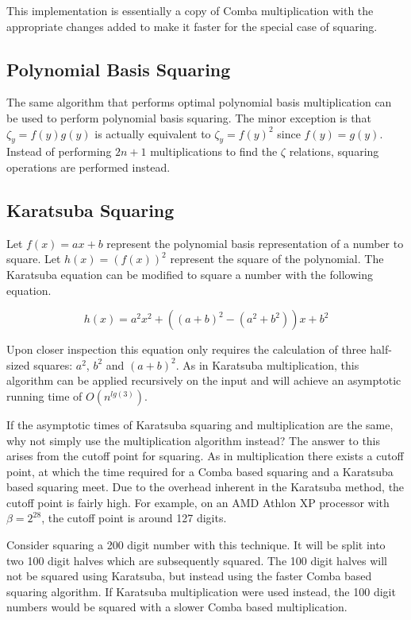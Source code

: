 \documentclass[b5paper]{book}
\begin{document}
This implementation is essentially a copy of Comba multiplication with the appropriate changes added to make it faster for 
the special case of squaring.  

\subsection{Polynomial Basis Squaring}
The same algorithm that performs optimal polynomial basis multiplication can be used to perform polynomial basis squaring.  The minor exception
is that $\zeta_y = f(y)g(y)$ is actually equivalent to $\zeta_y = f(y)^2$ since $f(y) = g(y)$.  Instead of performing $2n + 1$
multiplications to find the $\zeta$ relations, squaring operations are performed instead.  

\subsection{Karatsuba Squaring}
Let $f(x) = ax + b$ represent the polynomial basis representation of a number to square.  
Let $h(x) = \left ( f(x) \right )^2$ represent the square of the polynomial.  The Karatsuba equation can be modified to square a 
number with the following equation.

\begin{equation}
h(x) = a^2x^2 + \left ((a + b)^2 - (a^2 + b^2) \right )x + b^2
\end{equation}

Upon closer inspection this equation only requires the calculation of three half-sized squares: $a^2$, $b^2$ and $(a + b)^2$.  As in 
Karatsuba multiplication, this algorithm can be applied recursively on the input and will achieve an asymptotic running time of 
$O \left ( n^{lg(3)} \right )$.

If the asymptotic times of Karatsuba squaring and multiplication are the same, why not simply use the multiplication algorithm 
instead?  The answer to this arises from the cutoff point for squaring.  As in multiplication there exists a cutoff point, at which the 
time required for a Comba based squaring and a Karatsuba based squaring meet.  Due to the overhead inherent in the Karatsuba method, the cutoff 
point is fairly high.  For example, on an AMD Athlon XP processor with $\beta = 2^{28}$, the cutoff point is around 127 digits.  

Consider squaring a 200 digit number with this technique.  It will be split into two 100 digit halves which are subsequently squared.  
The 100 digit halves will not be squared using Karatsuba, but instead using the faster Comba based squaring algorithm.  If Karatsuba multiplication
were used instead, the 100 digit numbers would be squared with a slower Comba based multiplication.  
\end{document}
